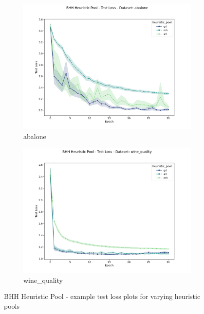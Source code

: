 \begin{figure}[htbp]
	\begin{subfigure}{0.5\textwidth}
    	\centering
        \includegraphics[width=\textwidth]{analysis/bhh_heuristic_pool/figures/test/loss/abalone.png}
        \caption{abalone}
        \label{fig:results:heuristic_pool:figures:loss1}
	\end{subfigure}
		\begin{subfigure}{0.5\textwidth}
    	\centering
        \includegraphics[width=\textwidth]{analysis/bhh_heuristic_pool/figures/test/loss/wine_quality.png}
        \caption{wine\_quality}
        \label{fig:results:heuristic_pool:figures:loss2}
	\end{subfigure}
	\caption{\Acs{BHH} Heuristic Pool - example test loss plots for varying heuristic pools}
	\label{fig:results:heuristic_pool:figures:loss}
\end{figure}

